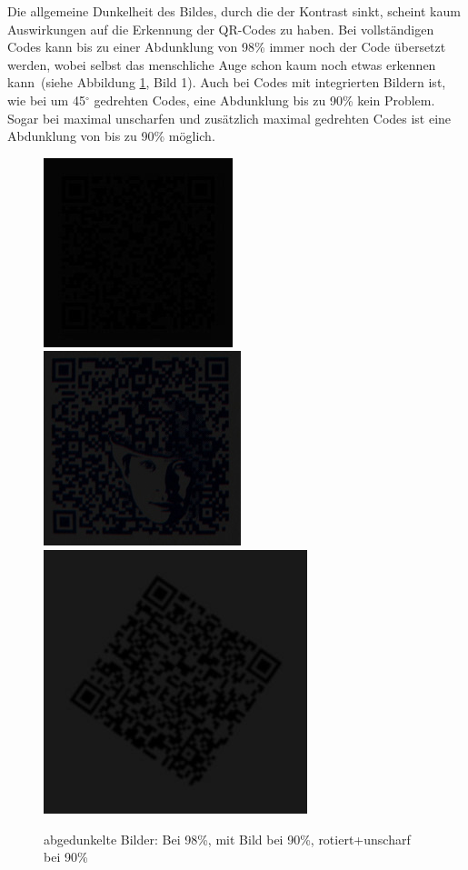 Die allgemeine Dunkelheit des Bildes, durch die der Kontrast sinkt, scheint kaum Auswirkungen auf die Erkennung der QR-Codes zu haben. Bei vollständigen Codes kann bis zu einer Abdunklung von 98\% immer noch der Code übersetzt werden, wobei selbst das menschliche Auge schon kaum noch etwas erkennen kann~(siehe Abbildung \ref{fig:qrdark}, Bild 1). Auch bei Codes mit integrierten Bildern ist, wie bei um 45$ ^\circ $ gedrehten Codes, eine Abdunklung bis zu 90\% kein Problem. Sogar bei maximal unscharfen und zusätzlich maximal gedrehten Codes ist eine Abdunklung von bis zu 90\% möglich.
\begin{figure}[H]
  \centering
  \includegraphics[height=0.3\textwidth]{img/QR/dark_03_98.jpg}
  \includegraphics[height=0.3\textwidth]{img/QR/dark_04_90.jpg}
  \includegraphics[height=0.3\textwidth]{img/QR/blurrydarkrotate_03_3_90_35.jpg}
  \caption{abgedunkelte Bilder: Bei 98\%, mit Bild bei 90\%, rotiert+unscharf bei 90\%}
  \label{fig:qrdark}
\end{figure}

